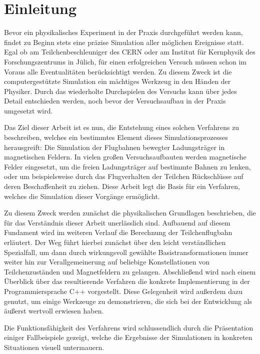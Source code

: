 \chapter{Einleitung}

Bevor ein physikalisches Experiment in der Praxis durchgef\"uhrt werden kann, findet zu Beginn stets eine
pr\"azise Simulation aller m\"oglichen Ereignisse statt. Egal ob am Teilchenbeschleuniger des CERN oder am
Institut f\"ur Kernphysik des Forschungszentrums in J\"ulich, f\"ur einen erfolgreichen Versuch
m\"ussen schon im Voraus alle Eventualit\"aten ber\"ucksichtigt werden. Zu diesem Zweck ist die
computergest\"utzte Simulation ein m\"achtiges Werkzeug in den H\"anden der Physiker. Durch das
wiederholte Durchspielen des Versuchs kann \"uber jedes Detail entschieden werden, noch bevor der
Versuchsaufbau in der Praxis umgesetzt wird.

Das Ziel dieser Arbeit ist es nun, die Entstehung eines
solchen Verfahrens zu beschreiben, welches ein bestimmtes Element dieses Simulationsprozesses
herausgreift: Die Simulation der Flugbahnen bewegter Ladungstr\"ager in magnetischen Feldern.
In vielen gro{\ss}en Versuchsaufbauten werden magnetische
Felder eingesetzt, um die freien Ladungstr\"ager auf bestimmte Bahnen zu lenken, oder um
beispielsweise durch das Flugverhalten der Teilchen R\"uckschl\"usse auf deren Beschaffenheit zu
ziehen. Diese Arbeit legt die Basis f\"ur ein Verfahren, welches die Simulation dieser Vorg\"ange
erm\"oglicht.

Zu diesem Zweck werden zun\"achst die physikalischen Grundlagen beschrieben, die f\"ur das
Verst\"andnis dieser Arbeit unerl\"asslich sind. Aufbauend auf diesem Fundament wird im weiteren
Verlauf die Berechnung der Teilchenflugbahn erl\"autert. Der Weg f\"uhrt hierbei zun\"achst \"uber
den leicht verst\"andlichen Spezialfall, um dann durch wirkungsvoll gew\"ahlte Basistransformationen immer weiter
hin zur Verallgemeinerung auf beliebige Konstellationen von Teilchenzust\"anden und Magnetfeldern zu
gelangen. Abschlie{\ss}end wird nach einem \"Uberblick \"uber das resultierende Verfahren die
konkrete Implementierung in der Programmiersprache C++ vorgestellt. Diese Gelegenheit wird
au{\ss}erdem dazu genutzt, um einige Werkzeuge zu demonstrieren, die sich bei der Entwicklung als
\"au{\ss}erst wertvoll erwiesen haben.

Die Funktionsf\"ahigkeit des Verfahrens wird schlussendlich
durch die Pr\"asentation einiger Fallbeispiele gezeigt, welche die Ergebnisse der Simulationen in
konkreten Situationen visuell untermauern.
